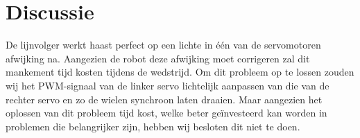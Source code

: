\documentclass{report}
\begin{document}
\section{Discussie}
De lijnvolger werkt haast perfect op een lichte in één van de servomotoren afwijking na. Aangezien de robot deze afwijking moet corrigeren zal dit mankement tijd kosten tijdens de wedstrijd. Om dit probleem op te lossen zouden wij het PWM-signaal van de linker servo lichtelijk aanpassen van die van de rechter servo en zo de wielen synchroon laten draaien. Maar aangezien het oplossen van dit probleem tijd kost, welke beter geïnvesteerd kan worden in problemen die belangrijker zijn, hebben wij besloten dit niet te doen.
\end{document}
